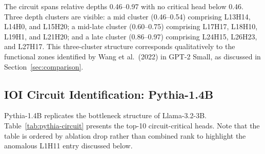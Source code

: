 \documentclass[11pt,a4paper]{article}
\begin{document}
The circuit spans relative depths 0.46--0.97 with no critical head below 0.46. Three
depth clusters are visible: a mid cluster (0.46--0.54) comprising L13H14, L14H0, and
L15H20; a mid-late cluster (0.60--0.75) comprising L17H17, L18H10, L19H1, and L21H20;
and a late cluster (0.86--0.97) comprising L24H15, L26H23, and L27H17. This
three-cluster structure corresponds qualitatively to the functional zones identified by
Wang et al.\ (2022) in GPT-2 Small, as discussed in Section~\ref{sec:comparison}.

\subsection{IOI Circuit Identification: Pythia-1.4B}
\label{sec:pythia-ioi}

Pythia-1.4B replicates the bottleneck structure of Llama-3.2-3B.
Table~\ref{tab:pythia-circuit} presents the top-10 circuit-critical heads. Note that
the table is ordered by ablation drop rather than combined rank to highlight the
anomalous L1H11 entry discussed below.
\end{document}
